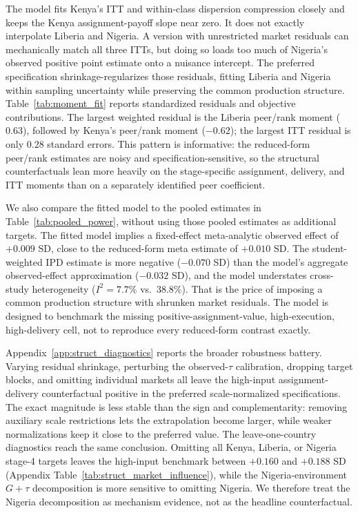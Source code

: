 \documentclass[11pt]{article}
\begin{document}
The model fits Kenya's ITT and within-class dispersion compression closely and keeps the Kenya assignment-payoff slope near zero. It does not exactly interpolate Liberia and Nigeria. A version with unrestricted market residuals can mechanically match all three ITTs, but doing so loads too much of Nigeria's observed positive point estimate onto a nuisance intercept. The preferred specification shrinkage-regularizes those residuals, fitting Liberia and Nigeria within sampling uncertainty while preserving the common production structure. Table~\ref{tab:moment_fit} reports standardized residuals and objective contributions. The largest weighted residual is the Liberia peer/rank moment ($0.63$), followed by Kenya's peer/rank moment ($-0.62$); the largest ITT residual is only $0.28$ standard errors. This pattern is informative: the reduced-form peer/rank estimates are noisy and specification-sensitive, so the structural counterfactuals lean more heavily on the stage-specific assignment, delivery, and ITT moments than on a separately identified peer coefficient.

We also compare the fitted model to the pooled estimates in Table~\ref{tab:pooled_power}, without using those pooled estimates as additional targets. The fitted model implies a fixed-effect meta-analytic observed effect of $+0.009$ SD, close to the reduced-form meta estimate of $+0.010$ SD. The student-weighted IPD estimate is more negative ($-0.070$ SD) than the model's aggregate observed-effect approximation ($-0.032$ SD), and the model understates cross-study heterogeneity ($I^2=7.7\%$ vs.\ 38.8\%). That is the price of imposing a common production structure with shrunken market residuals. The model is designed to benchmark the missing positive-assignment-value, high-execution, high-delivery cell, not to reproduce every reduced-form contrast exactly.

Appendix~\ref{app:struct_diagnostics} reports the broader robustness battery. Varying residual shrinkage, perturbing the observed-$\tau$ calibration, dropping target blocks, and omitting individual markets all leave the high-input assignment-delivery counterfactual positive in the preferred scale-normalized specifications. The exact magnitude is less stable than the sign and complementarity: removing auxiliary scale restrictions lets the extrapolation become larger, while weaker normalizations keep it close to the preferred value. The leave-one-country diagnostics reach the same conclusion. Omitting all Kenya, Liberia, or Nigeria stage-4 targets leaves the high-input benchmark between $+0.160$ and $+0.188$ SD (Appendix Table~\ref{tab:struct_market_influence}), while the Nigeria-environment $G+\tau$ decomposition is more sensitive to omitting Nigeria. We therefore treat the Nigeria decomposition as mechanism evidence, not as the headline counterfactual.
\end{document}

